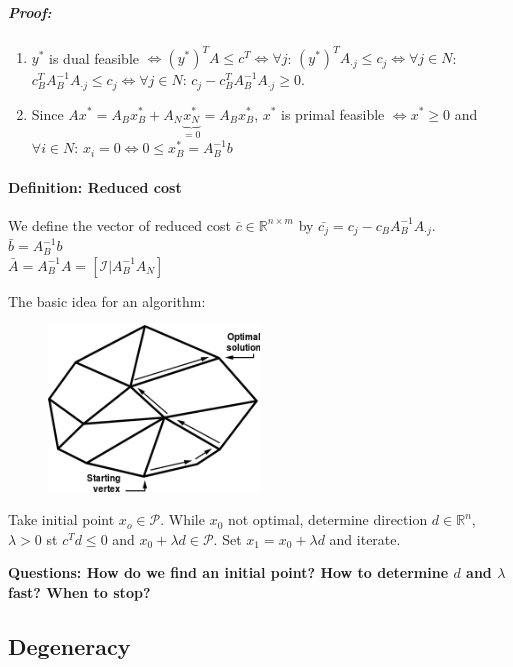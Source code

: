 \documentclass[main]{subfiles}
\begin{document}
\subparagraph{Proof:}
\begin{enumerate}
\item $y^*$ is dual feasible $\iff (y^*)^T A \leq c^T \iff \forall j$:
$(y^*)^T A_{\cdot j} \leq c_j \iff \forall j \in N$: $c^T_B A^{-1}_B
A_{\cdot j} \leq c_j \iff \forall j \in N$: $c_j - c^T_B A^{-1}_B A_{\cdot j}
\geq 0$.
\item Since $Ax^* = A_B x^*_B + A_N \underbrace{x^*_N}_{=0} = A_B x^*_B$,
$x^*$ is primal feasible $\iff x^* \geq 0$ and $\forall i \in N$:
$x_i = 0 \iff 0 \leq x^*_B = A^{-1}_B b$ 
\end{enumerate}

\paragraph{Definition: Reduced cost}
We define the vector of reduced cost $\bar{c} \in \mathbb{R}^{n \times m}$ by
$\bar{c_j} = c_j - c_B A^{-1}_B A_{\cdot j}$.\\
$\bar{b} = A^{-1}_B b$\\
$\bar{A} = A^{-1}_B A = [\mathcal{I} | A^{-1}_B A_N ]$

The basic idea for an algorithm:\\
\begin{figure}[!h]
  \label{fig:projection}
  \centering
    \includegraphics[width=0.5\textwidth]{imgs/simplex-description.png}
\end{figure}

Take initial point $x_o \in \mathcal{P}$. While $x_0$ not optimal, determine
direction $d \in \mathbb{R}^n$, $\lambda > 0$ st $c^T d \leq 0$ and
$x_0 + \lambda d \in \mathcal{P}$. Set $x_1 = x_0 + \lambda d$ and iterate.

\textbf{Questions: How do we find an initial point? How to determine $d$ and
$\lambda$ fast? When to stop?}

\subsection{Degeneracy}
\end{document}
